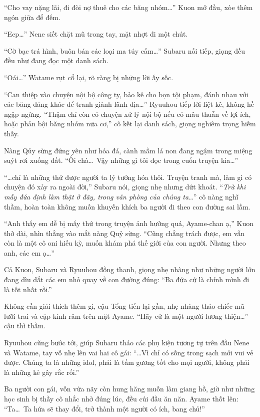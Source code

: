 \documentclass[../main.tex]{subfiles}
\begin{document}
``Cho vay nặng lãi, đi đòi nợ thuê cho các băng nhóm\dots'' Kuon mở đầu, xòe thêm ngón giữa để đếm.

``Eep\dots'' Nene siết chặt mũ trong tay, mặt nhợt đi một chút.

``Cờ bạc trá hình, buôn bán các loại ma túy cấm\dots'' Subaru nối tiếp, giọng đều đều như đang đọc một danh sách.

``Oái\dots'' Watame rụt cổ lại, rõ ràng bị những lời ấy sốc.

``Can thiệp vào chuyện nội bộ công ty, bảo kê cho bọn tội phạm, đánh nhau với các băng đảng khác để tranh giành lãnh địa\dots'' Ryuuhou tiếp lời liệt kê, không hề ngập ngừng. ``Thậm chí còn có chuyện xử lý nội bộ nếu có mâu thuẫn về lợi ích, hoặc phản bội băng nhóm nữa cơ,'' cô kết lại danh sách, giọng nghiêm trọng hiếm thấy.

Nàng Qủy sừng đứng yên như hóa đá, cành mầm lá non đang ngậm trong miệng suýt rơi xuống đất. ``Ối chà\dots\ Vậy những gì tôi đọc trong cuốn truyện kia\dots''

``\dots chỉ là những thứ được người ta lý tưởng hóa thôi. Truyện tranh mà, làm gì có chuyện đó xảy ra ngoài đời,'' Subaru nói, giọng nhẹ nhưng dứt khoát. ``\textit{Trừ khi mấy đứa định làm thật ở đây, trong văn phòng của chúng ta\dots}'' cô nàng nghĩ thầm, hoàn toàn không muốn khuyến khích ba người đi theo con đường sai lầm.

``Anh thấy em dễ bị mấy thứ trong truyện ảnh hưởng quá, Ayame-chan ạ,'' Kuon thở dài, nhìn thẳng vào mắt nàng Quỷ sừng. ``Cũng chẳng trách được, em vẫn còn là một cô oni hiếu kỳ, muốn khám phá thế giới của con người. Nhưng theo anh, các em ạ\dots''

Cả Kuon, Subaru và Ryuuhou đồng thanh, giọng nhẹ nhàng như những người lớn đang dìu dắt các em nhỏ quay về con đường đúng: ``Ba đứa cứ là chính mình đi là tốt nhất rồi.''

Không cần giải thích thêm gì, cậu Tổng tiến lại gần, nhẹ nhàng tháo chiếc mũ lưỡi trai và cặp kính râm trên mặt Ayame. ``Hãy cứ là một người lương thiện\dots'' cậu thì thầm.

Ryuuhou cũng bước tới, giúp Subaru tháo các phụ kiện tương tự trên đầu Nene và Watame, tay vỗ nhẹ lên vai hai cô gái: ``\dots Vì chỉ có sống trong sạch mới vui vẻ được. Chúng ta là những idol, phải là tấm gương tốt cho mọi người, không phải là những kẻ gây rắc rối.''

Ba người con gái, vốn vừa nãy còn hung hăng muốn làm giang hồ, giờ như những học sinh bị thầy cô nhắc nhở đúng lúc, đều cúi đầu ăn năn. Ayame thốt lên: ``Ta\dots\ Ta hứa sẽ thay đổi, trở thành một người có ích, bang chủ!''
\end{document}
